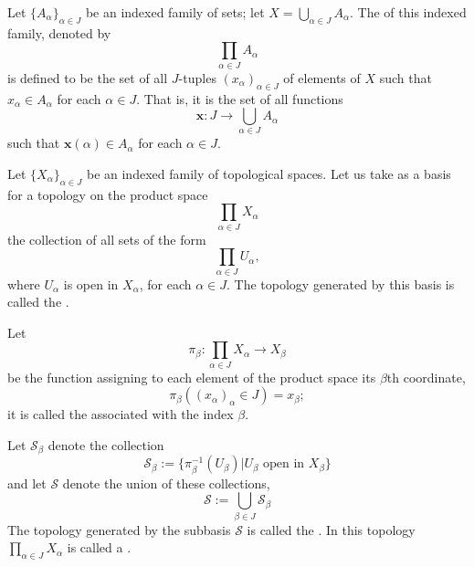 \documentclass[12pt, a4paper, oneside, openright, titlepage]{book}
\begin{document}
\begin{definition}
    Let $\{A_{\alpha}\}_{\alpha \in J}$ be an indexed family of sets; let $X = \bigcup_{\alpha \in J}A_{\alpha}$. The  of this indexed family, denoted by \begin{equation*}
        \prod\limits_{\alpha\in J}A_{\alpha}
    \end{equation*}
    is defined to be the set of all $J$-tuples $(x_{\alpha})_{\alpha\in J}$ of elements of $X$ such that $x_{\alpha} \in A_{\alpha}$ for each $\alpha \in J$. That is, it is the set of all functions \begin{equation*}
        \mathbf{x}:J\rightarrow\bigcup\limits_{\alpha \in J}A_{\alpha}
    \end{equation*}
    such that $\mathbf{x}(\alpha) \in A_{\alpha}$ for each $\alpha \in J$.
\end{definition}


\begin{definition}
    Let $\{X_{\alpha}\}_{\alpha \in J}$ be an indexed family of topological spaces. Let us take as a basis for a topology on the product space \begin{equation*}
        \prod\limits_{\alpha \in J}X_{\alpha}
    \end{equation*}
    the collection of all sets of the form \begin{equation*}
        \prod\limits_{\alpha \in J}U_{\alpha},
    \end{equation*}
    where $U_{\alpha}$ is open in $X_{\alpha}$, for each $\alpha \in J$. The topology generated by this basis is called the .
\end{definition}


\begin{definition}
    Let \begin{equation*}
        \pi_{\beta}:\prod\limits_{\alpha \in J}X_{\alpha}\rightarrow X_{\beta}
    \end{equation*}
    be the function assigning to each element of the product space its $\beta$th coordinate, \begin{equation*}
        \pi_{\beta}((x_{\alpha})_{\alpha} \in J) = x_{\beta};
    \end{equation*}
    it is called the  associated with the index $\beta$.
\end{definition}


\begin{definition}
    Let $\mathcal{S}_{\beta}$ denote the collection \begin{equation*}
        \mathcal{S}_{\beta} := \{\pi_{\beta}^{-1}(U_{\beta}) \vert U_{\beta}\text{ open in } X_{\beta}\}
    \end{equation*}
    and let $\mathcal{S}$ denote the union of these collections,\begin{equation*}
        \mathcal{S} := \bigcup\limits_{\beta \in J}\mathcal{S}_{\beta}
    \end{equation*}
    The topology generated by the subbasis $\mathcal{S}$ is called the . In this topology $\prod_{\alpha \in J}X_{\alpha}$ is called a .
\end{definition}
\end{document}

